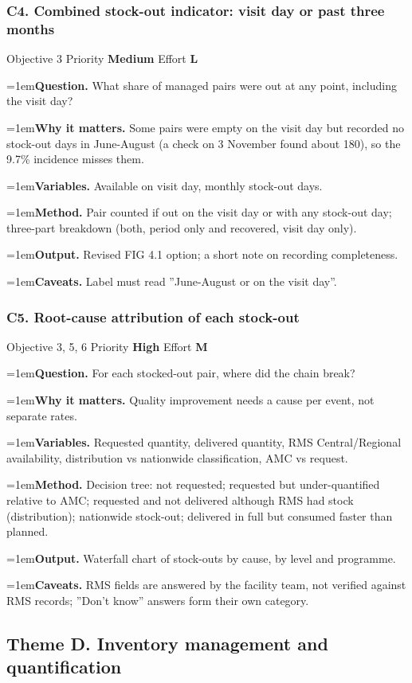 \documentclass[10pt,a4paper]{article}
\newcommand{\field}[2]{\par\hangindent=1em\textbf{#1.} #2}
\begin{document}
\subsubsection*{C4. Combined stock-out indicator: visit day or past three months}
{\footnotesize\color{gray} Objective 3 \textperiodcentered{} Priority \textbf{Medium} \textperiodcentered{} Effort \textbf{L}}
\field{Question}{What share of managed pairs were out at any point, including the visit day?}
\field{Why it matters}{Some pairs were empty on the visit day but recorded no stock-out days in June-August (a check on 3 November found about 180), so the 9.7\% incidence misses them.}
\field{Variables}{Available on visit day, monthly stock-out days.}
\field{Method}{Pair counted if out on the visit day or with any stock-out day; three-part breakdown (both, period only and recovered, visit day only).}
\field{Output}{Revised FIG 4.1 option; a short note on recording completeness.}
\field{Caveats}{Label must read ''June-August or on the visit day''.}
\subsubsection*{C5. Root-cause attribution of each stock-out}
{\footnotesize\color{gray} Objective 3, 5, 6 \textperiodcentered{} Priority \textbf{High} \textperiodcentered{} Effort \textbf{M}}
\field{Question}{For each stocked-out pair, where did the chain break?}
\field{Why it matters}{Quality improvement needs a cause per event, not separate rates.}
\field{Variables}{Requested quantity, delivered quantity, RMS Central/Regional availability, distribution vs nationwide classification, AMC vs request.}
\field{Method}{Decision tree: not requested; requested but under-quantified relative to AMC; requested and not delivered although RMS had stock (distribution); nationwide stock-out; delivered in full but consumed faster than planned.}
\field{Output}{Waterfall chart of stock-outs by cause, by level and programme.}
\field{Caveats}{RMS fields are answered by the facility team, not verified against RMS records; ''Don't know'' answers form their own category.}
\subsection{Theme D. Inventory management and quantification}
\end{document}
